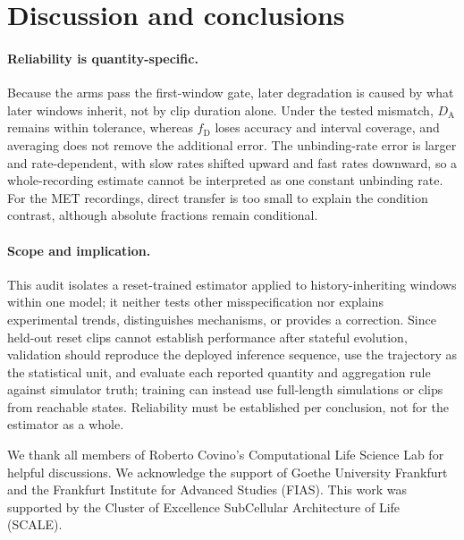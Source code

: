\documentclass{article}
\newcommand{\fD}{f_{\mathrm{D}}}
\newcommand{\DA}{D_{\mathrm{A}}}
\begin{document}
\section{Discussion and conclusions}
\label{sec:discussion}

\paragraph{Reliability is quantity-specific.} Because the arms pass the
first-window gate, later degradation is caused by what later windows inherit,
not by clip duration alone. Under the tested mismatch, $\DA$ remains within
tolerance, whereas $\fD$ loses accuracy and interval coverage, and averaging
does not remove the additional error. The unbinding-rate error is larger and
rate-dependent, with slow rates shifted upward and fast rates downward, so a
whole-recording estimate cannot be interpreted as one constant unbinding
rate. For the MET recordings, direct transfer is too small to explain the
condition contrast, although absolute fractions remain conditional.

\paragraph{Scope and implication.} This audit isolates a reset-trained
estimator applied to history-inheriting windows within one model; it neither
tests other misspecification nor explains experimental trends, distinguishes
mechanisms, or provides a correction. Since held-out reset clips cannot establish performance after stateful
evolution, validation should reproduce the deployed inference sequence, use
the trajectory as the statistical unit, and evaluate each reported quantity
and aggregation rule against simulator truth; training can instead use
full-length simulations or clips from reachable states. Reliability must be
established per conclusion, not for the estimator as a whole.

\makeatletter{}\makeatother
\begin{ack}
We thank all members of Roberto Covino's Computational Life Science Lab for
helpful discussions. We acknowledge the support of Goethe University Frankfurt
and the Frankfurt Institute for Advanced Studies (FIAS). This work was
supported by the Cluster of Excellence SubCellular Architecture of Life
(SCALE).
\end{ack}
\end{document}
